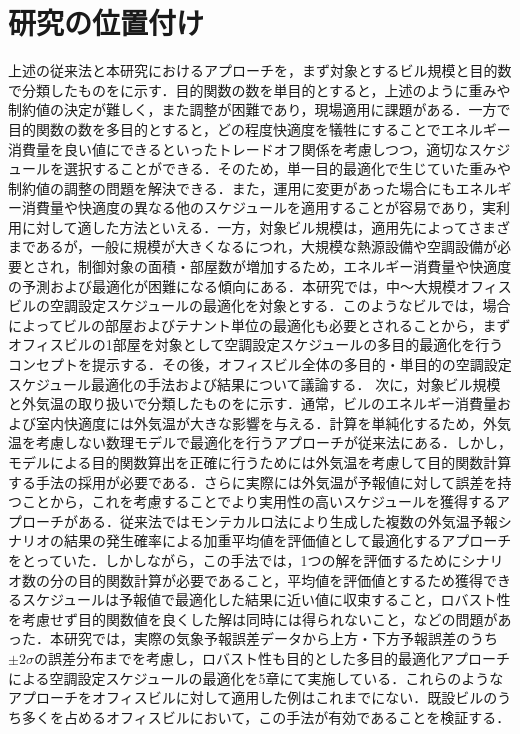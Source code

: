 \section{研究の位置付け}
上述の従来法と本研究におけるアプローチを，まず対象とするビル規模と目的数で分類したものをに示す．目的関数の数を単目的とすると，上述のように重みや制約値の決定が難しく，また調整が困難であり，現場適用に課題がある．一方で目的関数の数を多目的とすると，どの程度快適度を犠牲にすることでエネルギー消費量を良い値にできるといったトレードオフ関係を考慮しつつ，適切なスケジュールを選択することができる．そのため，単一目的最適化で生じていた重みや制約値の調整の問題を解決できる．また，運用に変更があった場合にもエネルギー消費量や快適度の異なる他のスケジュールを適用することが容易であり，実利用に対して適した方法といえる．一方，対象ビル規模は，適用先によってさまざまであるが，一般に規模が大きくなるにつれ，大規模な熱源設備や空調設備が必要とされ，制御対象の面積・部屋数が増加するため，エネルギー消費量や快適度の予測および最適化が困難になる傾向にある．本研究では，中～大規模オフィスビルの空調設定スケジュールの最適化を対象とする．このようなビルでは，場合によってビルの部屋およびテナント単位の最適化も必要とされることから，まずオフィスビルの1部屋を対象として空調設定スケジュールの多目的最適化を行うコンセプトを提示する．その後，オフィスビル全体の多目的・単目的の空調設定スケジュール最適化の手法および結果について議論する．
次に，対象ビル規模と外気温の取り扱いで分類したものをに示す．通常，ビルのエネルギー消費量および室内快適度には外気温が大きな影響を与える．計算を単純化するため，外気温を考慮しない数理モデルで最適化を行うアプローチが従来法にある\cite{Xiao17}．しかし，モデルによる目的関数算出を正確に行うためには外気温を考慮して目的関数計算する手法の採用が必要である．さらに実際には外気温が予報値に対して誤差を持つことから，これを考慮することでより実用性の高いスケジュールを獲得するアプローチがある．従来法\cite{Zhang14}ではモンテカルロ法により生成した複数の外気温予報シナリオの結果の発生確率による加重平均値を評価値として最適化するアプローチをとっていた．しかしながら，この手法では，1つの解を評価するためにシナリオ数の分の目的関数計算が必要であること，平均値を評価値とするため獲得できるスケジュールは予報値で最適化した結果に近い値に収束すること，ロバスト性を考慮せず目的関数値を良くした解は同時には得られないこと，などの問題があった．本研究では，実際の気象予報誤差データから上方・下方予報誤差のうち$\pm 2\sigma$の誤差分布までを考慮し，ロバスト性も目的とした多目的最適化アプローチによる空調設定スケジュールの最適化を5章にて実施している．これらのようなアプローチをオフィスビルに対して適用した例はこれまでにない．既設ビルのうち多くを占めるオフィスビルにおいて，この手法が有効であることを検証する．
